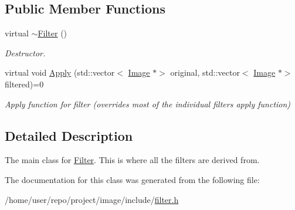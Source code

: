 \subsection*{Public Member Functions}
\begin{DoxyCompactItemize}
\item 
\mbox{\label{classFilter_aa37dc017d133404b3a326f363ce36b8a}} 
virtual \hyperlink{classFilter_aa37dc017d133404b3a326f363ce36b8a}{$\sim$\+Filter} ()
\begin{DoxyCompactList}\small\item\em Destructor. \end{DoxyCompactList}\item 
\mbox{\label{classFilter_afab0d50af44a19a370ebe46c69b8ff4e}} 
virtual void \hyperlink{classFilter_afab0d50af44a19a370ebe46c69b8ff4e}{Apply} (std\+::vector$<$ \hyperlink{classImage}{Image} $\ast$$>$ original, std\+::vector$<$ \hyperlink{classImage}{Image} $\ast$$>$ filtered)=0
\begin{DoxyCompactList}\small\item\em Apply function for filter (overrides most of the individual filters apply function) \end{DoxyCompactList}\end{DoxyCompactItemize}


\subsection{Detailed Description}
The main class for \hyperlink{classFilter}{Filter}. This is where all the filters are derived from. 

The documentation for this class was generated from the following file\+:\begin{DoxyCompactItemize}
\item 
/home/user/repo/project/image/include/\hyperlink{filter_8h}{filter.\+h}\end{DoxyCompactItemize}
